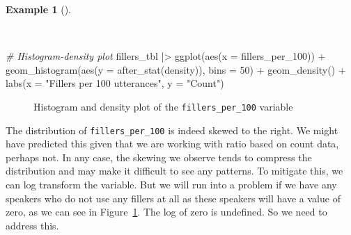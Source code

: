 \documentclass[
  letterpaper,
]{latex/krantz}
\newenvironment{Shaded}{\begin{snugshade}}{\end{snugshade}}
\newcommand{\AttributeTok}[1]{\textcolor[rgb]{0.00,0.00,0.00}{#1}}
\newcommand{\CommentTok}[1]{\textcolor[rgb]{0.00,0.00,0.00}{\textit{#1}}}
\newcommand{\DecValTok}[1]{\textcolor[rgb]{0.00,0.00,0.00}{#1}}
\newcommand{\FunctionTok}[1]{\textcolor[rgb]{0.00,0.00,0.00}{#1}}
\newcommand{\NormalTok}[1]{\textcolor[rgb]{0.00,0.00,0.00}{#1}}
\newcommand{\SpecialCharTok}[1]{\textcolor[rgb]{0.00,0.00,0.00}{#1}}
\newcommand{\StringTok}[1]{\textcolor[rgb]{0.00,0.00,0.00}{#1}}
\theoremstyle{definition}
\newtheorem{example}{Example}[chapter]
\theoremstyle{remark}
\begin{document}
\begin{example}[]\protect\hypertarget{exm-ida-num-uni-hist-dens}{}\label{exm-ida-num-uni-hist-dens}

~

\begin{Shaded}
\begin{Highlighting}[]
\CommentTok{\# Histogram{-}density plot}
\NormalTok{fillers\_tbl }\SpecialCharTok{|\textgreater{}}
  \FunctionTok{ggplot}\NormalTok{(}\FunctionTok{aes}\NormalTok{(}\AttributeTok{x =}\NormalTok{ fillers\_per\_100)) }\SpecialCharTok{+}
  \FunctionTok{geom\_histogram}\NormalTok{(}\FunctionTok{aes}\NormalTok{(}\AttributeTok{y =} \FunctionTok{after\_stat}\NormalTok{(density)), }\AttributeTok{bins =} \DecValTok{50}\NormalTok{) }\SpecialCharTok{+}
  \FunctionTok{geom\_density}\NormalTok{() }\SpecialCharTok{+}
  \FunctionTok{labs}\NormalTok{(}\AttributeTok{x =} \StringTok{"Fillers per 100 utterances"}\NormalTok{, }\AttributeTok{y =} \StringTok{"Count"}\NormalTok{)}
\end{Highlighting}
\end{Shaded}

\begin{figure}[H]


\caption{\label{fig-ida-num-uni-hist-dens}Histogram and density plot of
the \texttt{fillers\_per\_100} variable}

\end{figure}%

\end{example}

The distribution of \texttt{fillers\_per\_100} is indeed skewed to the
right. We might have predicted this given that we are working with ratio
based on count data, perhaps not. In any case, the skewing we observe
tends to compress the distribution and may make it difficult to see any
patterns. To mitigate this, we can log transform the variable. But we
will run into a problem if we have any speakers who do not use any
fillers at all as these speakers will have a value of zero, as we can
see in Figure~\ref{fig-ida-num-uni-hist-dens}. The log of zero is
undefined. So we need to address this.
\end{document}
